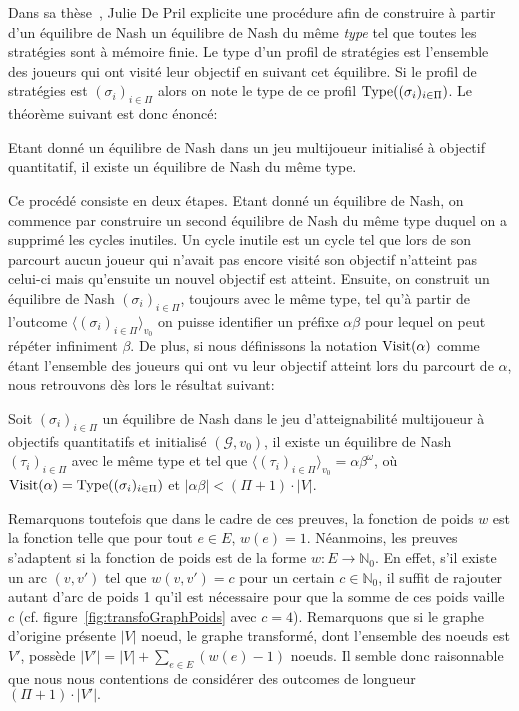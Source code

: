 Dans sa thèse~\cite{juliePhd}, Julie De Pril explicite une procédure afin de construire à partir d'un équilibre de Nash un équilibre de Nash du même \emph{type} tel que toutes les stratégies sont à mémoire finie. Le type d'un profil de stratégies est l'ensemble des joueurs qui ont visité leur objectif en suivant cet équilibre. Si le profil de stratégies est $(\sigma_i)_{i \in \Pi}$ alors on note le type de ce profil $\operatorname*{Type}((\sigma_i)_{i\in \Pi})$. Le théorème suivant est donc énoncé:

\begin{thm}
	Etant donné un équilibre de Nash dans un jeu multijoueur initialisé à objectif quantitatif, il existe un équilibre de Nash du même type.
\end{thm}

Ce procédé consiste en deux étapes. Etant donné un équilibre de Nash, on commence par construire un second équilibre de Nash du même type duquel on a supprimé les cycles inutiles. Un cycle inutile est un cycle tel que lors de son parcourt aucun joueur qui n'avait pas encore visité son objectif n'atteint pas celui-ci mais qu'ensuite un nouvel objectif est atteint. Ensuite, on construit un équilibre de Nash $(\sigma_i)_{i\in \Pi}$, toujours avec le même type, tel qu'à partir de l'outcome $\langle (\sigma_i)_{i\in \Pi}\rangle_{v_0}$ on puisse identifier un préfixe $\alpha\beta$ pour lequel on peut répéter infiniment $\beta$. De plus, si nous définissons la notation $\operatorname*{Visit}(\alpha)$ comme étant l'ensemble des joueurs qui ont vu leur objectif atteint lors du parcourt de $\alpha$, nous retrouvons dès lors le résultat suivant:

\begin{propriete}
	\label{prop: rechEqPert1}
	Soit $(\sigma_i)_{i\in \Pi}$ un équilibre de Nash dans le jeu d'atteignabilité multijoueur à objectifs quantitatifs et initialisé $(\mathcal{G}, v_0)$, il existe un équilibre de Nash $(\tau_i)_{i\in \Pi}$ avec le même type et tel que $\langle (\tau_i)_{i\in \Pi} \rangle_{v_0} = \alpha \beta^{\omega}$, où \linebreak $\operatorname*{Visit}(\alpha) = \operatorname*{Type}((\sigma_i)_{i \in \Pi})$ et $|\alpha\beta| < (\Pi + 1)\cdot |V|$.
\end{propriete}
Remarquons toutefois que dans le cadre de ces preuves, la fonction de poids $w$ est la fonction telle que pour tout $e \in E$, $w(e) = 1$. Néanmoins, les preuves s'adaptent si la fonction de poids est de la forme \linebreak $w : E \rightarrow \mathbb{N}_{0}$. En effet, s'il existe un arc $(v,v')$ tel que $w(v,v') = c$ pour un certain $c \in \mathbb{N}_{0}$, il suffit de rajouter autant d'arc de poids 1 qu'il est nécessaire pour que la somme de ces poids vaille $c$ (cf. figure~\ref{fig:transfoGraphPoids} avec $c = 4$). Remarquons que si le graphe d'origine présente $|V|$ noeud, le graphe transformé, dont l'ensemble des noeuds est $V'$, possède $|V'| = |V| + \sum_{e \in E} (w(e) - 1)$ noeuds. Il semble donc raisonnable que nous nous contentions de considérer des outcomes de longueur $(\Pi + 1)\cdot |V'|.$\\

